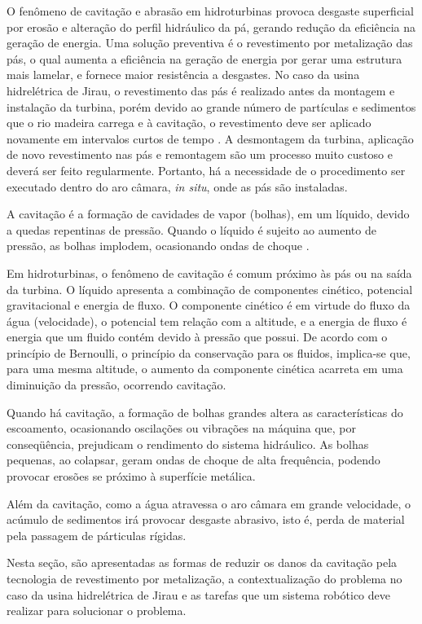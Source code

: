 O fenômeno de cavitação e abrasão em hidroturbinas provoca desgaste
superficial por erosão e alteração do perfil
hidráulico da pá, gerando redução da eficiência na geração de energia.
Uma solução preventiva é o revestimento por metalização das pás, o qual aumenta a eficiência na
geração de energia por gerar uma estrutura mais lamelar, e fornece maior
resistência a desgastes. No caso da usina hidrelétrica de Jirau, o revestimento
das pás é realizado antes da montagem e instalação da turbina, porém devido ao grande número de
partículas e sedimentos que o rio madeira carrega e à cavitação, o revestimento
deve ser aplicado novamente em intervalos curtos de tempo
\citep{santa2009slurry}. A desmontagem da turbina, aplicação de novo
revestimento nas pás e remontagem são um processo muito custoso e deverá ser
feito regularmente. Portanto, há a necessidade de o procedimento ser
executado dentro do aro câmara, \textit{in situ}, onde as pás são instaladas.

A cavitação é a formação de cavidades de vapor (bolhas), em um líquido, devido a
quedas repentinas de pressão. Quando o líquido é sujeito ao aumento de pressão,
as bolhas implodem, ocasionando ondas de choque \citep{brennen2013cavitation}.

Em hidroturbinas, o fenômeno de cavitação é comum próximo às pás ou
na saída da turbina. O líquido apresenta a combinação
de componentes cinético, potencial gravitacional e energia de fluxo. O
componente cinético é em virtude do fluxo da água (velocidade), o potencial tem
relação com a altitude, e a energia de fluxo é energia que um fluido contém
devido à pressão que possui. De acordo com o princípio de Bernoulli, o princípio
da conservação para os fluidos, implica-se que, para uma mesma altitude, o
aumento da componente cinética acarreta em uma diminuição da pressão, ocorrendo
cavitação. 

Quando há cavitação, a formação de bolhas grandes altera as características do
escoamento, ocasionando oscilações ou vibrações na máquina que, por
conseqüência, prejudicam o rendimento do sistema hidráulico. As bolhas
pequenas, ao colapsar, geram ondas de choque de alta frequência, podendo provocar erosões se
próximo à superfície metálica.

Além da cavitação, como a água atravessa o aro câmara em grande velocidade, o
acúmulo de sedimentos irá provocar desgaste abrasivo, isto é, perda de material
pela passagem de párticulas rígidas. 

Nesta seção, são apresentadas as formas de reduzir os danos da cavitação pela
tecnologia de revestimento por metalização, a contextualização do problema no
caso da usina hidrelétrica de Jirau e as tarefas que um sistema robótico deve
realizar para solucionar o problema.

